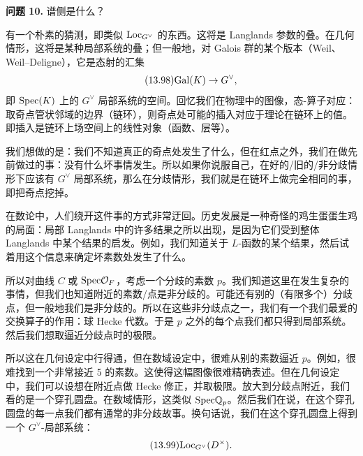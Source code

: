 \medskip\noindent\textbf{问题 10.} 谱侧是什么？

有一个朴素的猜测，即类似 $\mathrm{Loc}_{G^\vee}$ 的东西。这将是 Langlands 参数的叠。在几何情形，这将是某种局部系统的叠；但一般地，对 Galois 群的某个版本（Weil、Weil–Deligne），它是态射的汇集
\begin{equation}\tag{13.98}
\mathrm{Gal}(K)\to G^\vee,
\end{equation}
即 $\mathrm{Spec}(K)$ 上的 $G^\vee$ 局部系统的空间。回忆我们在物理中的图像，态-算子对应：取奇点管状邻域的边界（链环），则奇点处可能的插入对应于理论在链环上的值。即插入是链环上场空间上的线性对象（函数、层等）。

我们想做的是：我们不知道真正的奇点处发生了什么，但在红点之外，我们在做先前做过的事：没有什么坏事情发生。所以如果你说服自己，在好的/旧的/非分歧情形下应该有 $G^\vee$ 局部系统，那么在分歧情形，我们就是在链环上做完全相同的事，即把奇点挖掉。

在数论中，人们绕开这件事的方式非常迂回。历史发展是一种奇怪的鸡生蛋蛋生鸡的局面：局部 Langlands 中的许多结果之所以出现，是因为它们受到整体 Langlands 中某个结果的启发。例如，我们知道关于 $L$-函数的某个结果，然后试着用这个信息来确定坏素数处发生了什么。

所以对曲线 $C$ 或 $\mathrm{Spec}\mathcal{O}_F$，考虑一个分歧的素数 $p$。我们知道这里在发生复杂的事情，但我们也知道附近的素数/点是非分歧的。可能还有别的（有限多个）分歧点，但一般地我们是非分歧的。所以在这些非分歧点之一，我们有一个我们最爱的交换算子的作用：球 Hecke 代数。于是 $p$ 之外的每个点我们都只得到局部系统。然后我们想取逼近分歧点时的极限。

所以这在几何设定中行得通，但在数域设定中，很难从别的素数逼近 $p$。例如，很难找到一个非常接近 5 的素数。这使得这幅图像很难精确表述。但在几何设定中，我们可以设想在附近点做 Hecke 修正，并取极限。放大到分歧点附近，我们看的是一个穿孔圆盘。在数域情形，这类似 $\mathrm{Spec}\mathbb{Q}_p$。然后我们在说，在这个穿孔圆盘的每一点我们都有通常的非分歧故事。换句话说，我们在这个穿孔圆盘上得到一个 $G^\vee$-局部系统：
\begin{equation}\tag{13.99}
\mathrm{Loc}_{G^\vee}(D^\times).
\end{equation}

